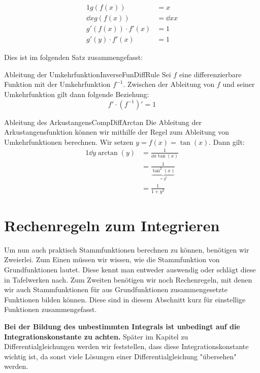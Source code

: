 \begin{alignat*}{1}
    g(f(x)) &= x \\
    \dd{}{x} g(f(x)) &= \dd{}{x} x \\
    g'(f(x)) \cdot f'(x) &= 1 \\
    g'(y) \cdot f'(x) &= 1
\end{alignat*}

Dies ist im folgenden Satz zusammengefasst:

\begin{statement}{Ableitung der Umkehrfunktion}{InverseFunDiffRule}
    Sei $f$ eine differenzierbare Funktion mit der Umkehrfunktion $f^{-1}$. Zwischen der Ableitung von $f$ und seiner Umkehrfunktion gilt dann folgende Beziehung:
    $$
        f' \cdot (f^{-1})' = 1
    $$
\end{statement}

\begin{example}{Ableitung des Arkustangens}{CompDiffArctan}
    Die Ableitung der Arkustangensfunktion können wir mithilfe der Regel zum Ableitung von Umkehrfunktionen berechnen. Wir setzen $y = f(x) = \tan(x)$. Dann gilt:
    \begin{alignat}{1}
        \dd{}{y} \arctan(y) &= \frac{1}{\dd{}{x} \tan(x)} \\
                            &= \frac{1}{\underbrace{\tan^2(x)}_{=y^2}} \\
                            &= \frac{1}{1+y^2}
    \end{alignat}
\end{example}

\section{Rechenregeln zum Integrieren}

Um nun auch praktisch Stammfunktionen berechnen zu können, benötigen wir Zweierlei. Zum Einen müssen wir wissen, wie die Stammfunktion von Grundfunktionen lautet. Diese kennt man entweder auswendig oder schlägt diese in Tafelwerken nach. Zum Zweiten benötigen wir noch Rechenregeln, mit denen wir auch Stammfunktionen für aus Grundfunktionen zusammengesetzte Funktionen bilden können. Diese sind in diesem Abschnitt kurz für einstellige Funktionen zusammengefasst.

\textbf{Bei der Bildung des unbestimmten Integrals ist unbedingt auf die Integrationskonstante zu achten.} Später im Kapitel zu Differentialgleichungen werden wir feststellen, dass diese Integrationskonstante wichtig ist, da sonst viele Lösungen einer Differentialgleichung "übersehen" werden.

